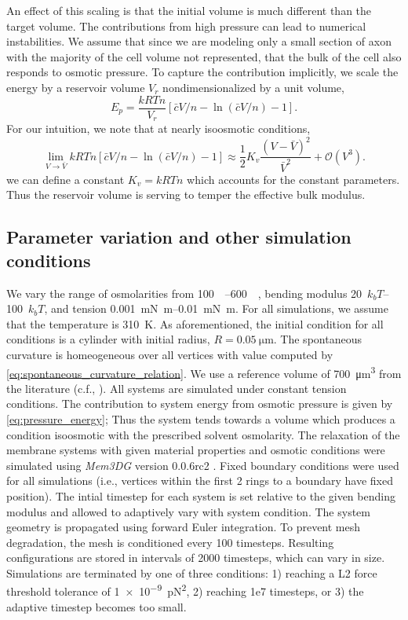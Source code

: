 \documentclass[11pt]{article}
\begin{document}
An effect of this scaling is that the initial volume is much different than the target volume. 
The contributions from high pressure can lead to numerical instabilities. 
We assume that since we are modeling only a small section of axon with the majority of the cell volume not represented, that the bulk of the cell also responds to osmotic pressure.
To capture the contribution implicitly, we scale the energy by a reservoir volume \(V_r\) nondimensionalized by a unit volume,
\begin{equation}
    E_p =\frac{kRTn}{V_r}[\bar{c}V/n - \ln(\bar{c}V/n) -1].
    \label{eq:pressure_energy}
\end{equation}
For our intuition, we note that at nearly isoosmotic conditions,
\begin{equation}
    \lim_{V\to\bar{V}} kRTn[\bar{c}V/n - \ln(\bar{c}V/n) -1] \approx \frac{1}{2}K_v \frac{(V - \bar{V})^2}{\bar{V}^2} + \mathcal{O}(V^3).
\end{equation}
we can define a constant \(K_v = kRTn\) which accounts for the constant parameters.
Thus the reservoir volume is serving to temper the effective bulk modulus.

\subsection{Parameter variation and other simulation conditions}

We vary the range of osmolarities from \SIrange[]{100}{600}{\milli\osm}, bending modulus \SIrange[]{20}{100}{\(k_bT\)}, and tension \SIrange[]{0.001}{0.01}{\milli\newton\meter}.
For all simulations, we assume that the temperature is \SI{310}{\kelvin}.
As aforementioned, the initial condition for all conditions is a cylinder with initial radius, \(R = \SI{0.05}{\micro\meter}\).
The spontaneous curvature is homeogeneous over all vertices with value computed by \cref{eq:spontaneous_curvature_relation}.
We use a reference volume of \SI{700}{\micro\meter\cubed} from the literature (c.f., \textcite{LarsenEtAl2021}).
All systems are simulated under constant tension conditions.
The contribution to system energy from osmotic pressure is given by \cref{eq:pressure_energy};
Thus the system tends towards a volume which produces a condition isoosmotic with the prescribed solvent osmolarity.
The relaxation of the membrane systems with given material properties and osmotic conditions were simulated using \textit{Mem3DG} version 0.0.6rc2 \cite{ZhuEtAl2022}.
Fixed boundary conditions were used for all simulations (i.e., vertices within the first 2 rings to a boundary have fixed position).
The intial timestep for each system is set relative to the given bending modulus and allowed to adaptively vary with system condition.
The system geometry is propagated using forward Euler integration.
To prevent mesh degradation, the mesh is conditioned every 100 timesteps.
Resulting configurations are stored in intervals of 2000 timesteps, which can vary in size.
Simulations are terminated by one of three conditions: 1) reaching a L2 force threshold tolerance of \SI{1e-9}{\pico\newton\squared}, 2) reaching \si{1e7} timesteps, or 3) the adaptive timestep becomes too small.
\end{document}
